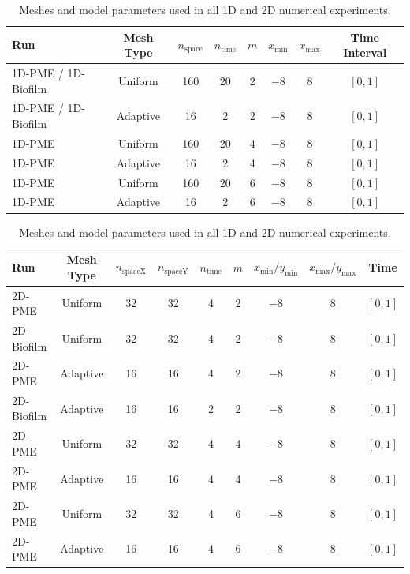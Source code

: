 \documentclass[review,11pt]{article}
\numberwithin{equation}{section}
\begin{document}
\iffalse
\begin{table}[h!]
\centering
\begin{minipage}{0.95\textwidth}
\centering
\begin{tabular}{lccccccc}
\toprule
\textbf{Run} & \textbf{Mesh Type} & $n_{\mathrm{space}}$ & $n_{\mathrm{time}}$
& $m$ & $x_{\min}$ & $x_{\max}$ & Time Interval \\
\midrule
1D-PME / 1D-Biofilm & Uniform  & 160 & 20 & 2 & $-8$ & $8$ & $[0,1]$ \\
1D-PME / 1D-Biofilm & Adaptive & 16  & 2  & 2 & $-8$ & $8$ & $[0,1]$ \\
\midrule
1D-PME              & Uniform  & 160 & 20 & 4 & $-8$ & $8$ & $[0,1]$ \\
1D-PME              & Adaptive & 16  & 2  & 4 & $-8$ & $8$ & $[0,1]$ \\
\midrule
1D-PME              & Uniform  & 160 & 20 & 6 & $-8$ & $8$ & $[0,1]$ \\
1D-PME              & Adaptive & 16  & 2  & 6 & $-8$ & $8$ & $[0,1]$ \\
\bottomrule
\end{tabular}
\end{minipage}

\vspace{1em}

\begin{minipage}{0.95\textwidth}
\centering
\begin{tabular}{lcccccccc}
\toprule
\textbf{Run} & \textbf{Mesh Type} & $n_{\mathrm{spaceX}}$ & $n_{\mathrm{spaceY}}$
& $n_{\mathrm{time}}$ & $m$ & $x_{\min}/y_{\min}$ & $x_{\max}/y_{\max}$ & Time \\
\midrule
2D-PME      & Uniform  & 32 & 32 & 4 & 2 & $-8$ & $8$ & $[0,1]$ \\
2D-Biofilm  & Uniform  & 32 & 32 & 4 & 2 & $-8$ & $8$ & $[0,1]$ \\
2D-PME      & Adaptive & 16 & 16 & 4 & 2 & $-8$ & $8$ & $[0,1]$ \\
2D-Biofilm  & Adaptive & 16 & 16 & 2 & 2 & $-8$ & $8$ & $[0,1]$ \\
\midrule
2D-PME      & Uniform  & 32 & 32 & 4 & 4 & $-8$ & $8$ & $[0,1]$ \\
2D-PME      & Adaptive & 16 & 16 & 4 & 4 & $-8$ & $8$ & $[0,1]$ \\
\midrule
2D-PME      & Uniform  & 32 & 32 & 4 & 6 & $-8$ & $8$ & $[0,1]$ \\
2D-PME      & Adaptive & 16 & 16 & 4 & 6 & $-8$ & $8$ & $[0,1]$ \\
\bottomrule
\end{tabular}
\end{minipage}
\caption{Meshes and model parameters used in all 1D and 2D numerical experiments.}
\label{tab:mesh_params_all}
\end{table}
\end{document}
